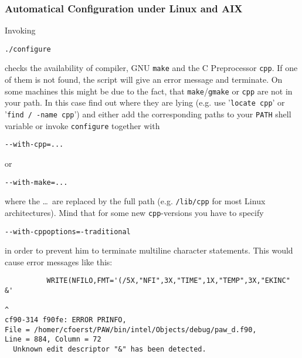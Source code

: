 \documentclass[a4paper,10pt]{article}
\begin{document}
\subsubsection*{Automatical Configuration under Linux and AIX}
\label{sub:auto}
Invoking
\begin{verbatim}
./configure
\end{verbatim}
checks the availability of compiler, GNU \texttt{make} and the C Preprocessor
\texttt{cpp}.  If one of them is not found, the script will give an error
message and terminate.  On some machines this might be due to the fact, that
\texttt{make}/\texttt{gmake} or \texttt{cpp} are not in your path.  In this
case find out where they are lying (e.g. use '\texttt{locate cpp}' or
'\texttt{find / -name cpp}') and either add the corresponding paths to your
\texttt{PATH} shell variable or invoke \texttt{configure} together with
\begin{verbatim}
--with-cpp=...
\end{verbatim}
or
\begin{verbatim}
--with-make=...
\end{verbatim}
where the \ldots\ are replaced by the full path (e.g. \texttt{/lib/cpp} for
most Linux architectures).  Mind that for some new \texttt{cpp}-versions you
have to specify
\begin{verbatim}
--with-cppoptions=-traditional
\end{verbatim}
in order to prevent him to terminate multiline character statements.  This
would cause error messages like this:
\begin{verbatim}
          WRITE(NFILO,FMT='(/5X,"NFI",3X,"TIME",1X,"TEMP",3X,"EKINC"   &'
                                                                       ^
cf90-314 f90fe: ERROR PRINFO, 
File = /homer/cfoerst/PAW/bin/intel/Objects/debug/paw_d.f90, 
Line = 884, Column = 72
  Unknown edit descriptor "&" has been detected.
\end{verbatim}
\end{document}

